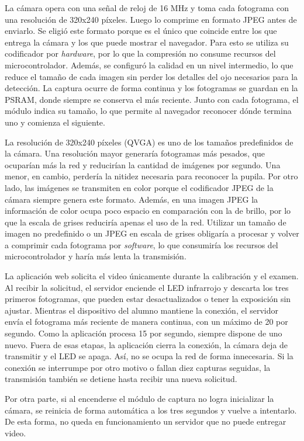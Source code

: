 La cámara opera con una señal de reloj de 16 MHz y toma cada fotograma con una resolución de 320x240 píxeles. Luego lo comprime en formato JPEG antes de enviarlo. Se eligió este formato porque es el único que coincide entre los que entrega la cámara y los que puede mostrar el navegador. Para esto se utiliza su codificador por \emph{hardware}, por lo que la compresión no consume recursos del microcontrolador. Además, se configuró la calidad en un nivel intermedio, lo que reduce el tamaño de cada imagen sin perder los detalles del ojo necesarios para la detección. La captura ocurre de forma continua y los fotogramas se guardan en la PSRAM, donde siempre se conserva el más reciente. Junto con cada fotograma, el módulo indica su tamaño, lo que permite al navegador reconocer dónde termina uno y comienza el siguiente.

La resolución de 320x240 píxeles (QVGA) es uno de los tamaños predefinidos de la cámara. Una resolución mayor generaría fotogramas más pesados, que ocuparían más la red y reducirían la cantidad de imágenes por segundo. Una menor, en cambio, perdería la nitidez necesaria para reconocer la pupila. Por otro lado, las imágenes se transmiten en color porque el codificador JPEG de la cámara siempre genera este formato. Además, en una imagen JPEG la información de color ocupa poco espacio en comparación con la de brillo, por lo que la escala de grises reduciría apenas el uso de la red. Utilizar un tamaño de imagen no predefinido o un JPEG en escala de grises obligaría a procesar y volver a comprimir cada fotograma por \emph{software}, lo que consumiría los recursos del microcontrolador y haría más lenta la transmisión. 

La aplicación web solicita el video únicamente durante la calibración y el examen. Al recibir la solicitud, el servidor enciende el LED infrarrojo y descarta los tres primeros fotogramas, que pueden estar desactualizados o tener la exposición sin ajustar. Mientras el dispositivo del alumno mantiene la conexión, el servidor envía el fotograma más reciente de manera continua, con un máximo de 20 por segundo. Como la aplicación procesa 15 por segundo, siempre dispone de uno nuevo. Fuera de esas etapas, la aplicación cierra la conexión, la cámara deja de transmitir y el LED se apaga. Así, no se ocupa la red de forma innecesaria. Si la conexión se interrumpe por otro motivo o fallan diez capturas seguidas, la transmisión también se detiene hasta recibir una nueva solicitud.

Por otra parte, si al encenderse el módulo de captura no logra inicializar la cámara, se reinicia de forma automática a los tres segundos y vuelve a intentarlo. De esta forma, no queda en funcionamiento un servidor que no puede entregar video.

